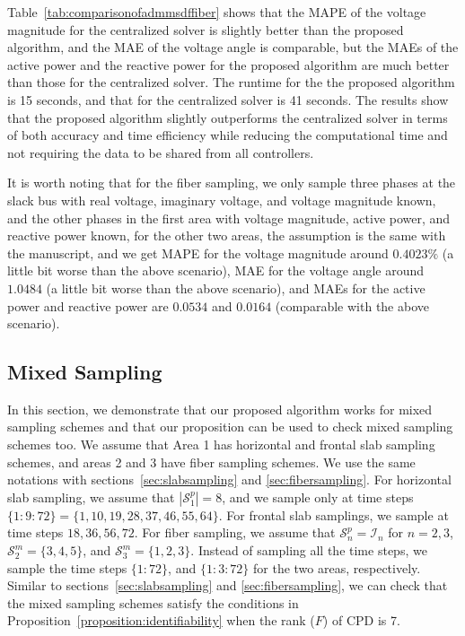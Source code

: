 \documentclass[journal]{IEEEtran}
\newcounter{assume}
\newcounter{propose}
\newcounter{thm}
\newcommand{\rev}[1]{{\color{black} #1}} %
\begin{document}
Table~\ref{tab:comparisonofadmmsdffiber} shows that the MAPE of the voltage magnitude for the centralized solver is slightly better than the proposed algorithm, and the MAE of the voltage angle is comparable, but the MAEs of the active power and the reactive power for the proposed algorithm are much better than those for the centralized solver. The runtime for the the proposed algorithm is 15 seconds, and that for the centralized solver is 41 seconds. The results show that the proposed algorithm slightly outperforms the centralized solver in terms of both accuracy and time efficiency while reducing the computational time and not requiring the data to be shared from all controllers.

\rev{It is worth noting that for the fiber sampling, we only sample three phases at the slack bus with real voltage, imaginary voltage, and voltage magnitude known, and the other phases in the first area with voltage magnitude, active power, and reactive power known, for the other two areas, the assumption is the same with the manuscript, and we get MAPE for the voltage magnitude around $0.4023\%$ (a little bit worse than the above scenario), MAE for the voltage angle around $1.0484$ (a little bit worse than the above scenario), and MAEs for the active power and reactive power are $0.0534$ and $0.0164$ (comparable with the above scenario). }

\subsection{Mixed Sampling}
In this section, we demonstrate that our proposed algorithm works for  mixed sampling schemes and that our proposition can be used to check mixed sampling schemes too. We assume that Area 1 has horizontal and frontal slab sampling schemes, and areas 2 and 3 have fiber sampling schemes. We use the same notations with sections~\ref{sec:slabsampling} and \ref{sec:fibersampling}. For horizontal slab sampling, we assume that $|\mathcal{S}_1^p|=8$, and  we sample only at time steps $\{1:9:72\}=\{1,10,19,28,37,46,55,64\}$.
For frontal slab samplings, we sample   at time steps $18,36,56,72$. For fiber sampling, we assume that $\mathcal{S}_n^p=\mathcal{I}_n$ for $n=2,3$, $\mathcal{S}_2^m =\{3,4,5\}$, and $\mathcal{S}_3^m =\{1,2,3\}$. Instead of sampling all the time steps, we sample
the time steps $\{1:72\}$,  and $\{1:3:72\}$  for the two areas, respectively. Similar to sections~\ref{sec:slabsampling} and \ref{sec:fibersampling}, we can check that the mixed sampling schemes satisfy the conditions in Proposition~\ref{proposition:identifiability} when the rank ($F$) of CPD is 7.
\end{document}
